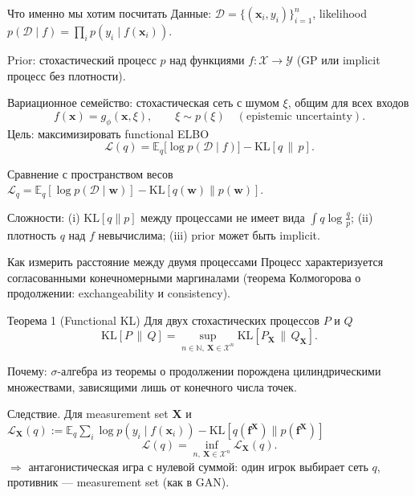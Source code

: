 \documentclass[aspectratio=169,9pt]{beamer}
\newcommand{\E}{\mathbb{E}}
\newcommand{\KL}{\mathrm{KL}}
\newcommand{\fx}{\mathbf{f}^{\mathbf{X}}}
\newcommand{\bx}{\mathbf{X}}
\begin{document}
\begin{frame}{Что именно мы хотим посчитать}
  Данные: $\mathcal D=\{(\mathbf x_i,y_i)\}_{i=1}^n$, likelihood $p(\mathcal D\mid f)=\prod_i p(y_i\mid f(\mathbf x_i))$.

  \medskip
  Prior: стохастический процесс $p$ над функциями $f:\mathcal X\to\mathcal Y$ (GP или implicit процесс без плотности).

  \medskip
  Вариационное семейство: стохастическая сеть с шумом $\xi$, общим для всех входов
  \[
    f(\mathbf x)=g_\phi(\mathbf x,\xi),\qquad \xi\sim p(\xi)
    \quad(\text{epistemic uncertainty}).
  \]
  Цель: максимизировать functional ELBO
  \[
    \mathcal L(q)=\E_q\big[\log p(\mathcal D\mid f)\big]-\KL[q\,\|\,p].
  \]
  \begin{block}{Сравнение с пространством весов}
    $\mathcal L_q=\E_q[\log p(\mathcal D\mid\mathbf w)]-\KL[q(\mathbf w)\|p(\mathbf w)]$.
  \end{block}
  Сложности: (i) $\KL[q\|p]$ между процессами не имеет вида $\int q\log\frac qp$; (ii) плотность $q$ над $f$ невычислима; (iii) prior может быть implicit.
\end{frame}

\begin{frame}{Как измерить расстояние между двумя процессами}
  Процесс характеризуется согласованными конечномерными маргиналами (теорема Колмогорова о продолжении: exchangeability и consistency).

  \begin{block}{Теорема 1 (Functional KL)}
    Для двух стохастических процессов $P$ и $Q$
    \[
      \KL[P\,\|\,Q]=\sup_{n\in\mathbb N,\ \bx\in\mathcal X^n}\KL[P_{\bx}\,\|\,Q_{\bx}].
    \]
  \end{block}
  Почему: $\sigma$-алгебра из теоремы о продолжении порождена цилиндрическими множествами, зависящими лишь от конечного числа точек.

  \medskip
  Следствие. Для measurement set $\bx$ и $\mathcal L_{\bx}(q):=\E_q\sum_{i}\log p(y_i\mid f(\mathbf x_i))-\KL[q(\fx)\|p(\fx)]$
  \[
    \mathcal L(q)=\inf_{n,\ \bx\in\mathcal X^n}\mathcal L_{\bx}(q).
  \]
  $\Rightarrow$ антагонистическая игра с нулевой суммой: один игрок выбирает сеть $q$, противник --- measurement set (как в GAN).
\end{frame}
\end{document}
